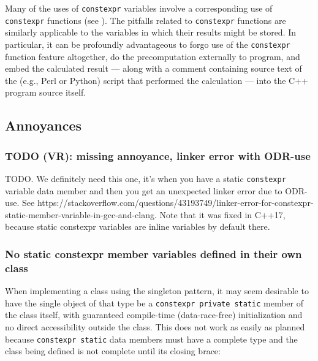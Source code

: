 Many of the uses of \lstinline!constexpr! variables involve a corresponding
use of \lstinline!constexpr! functions (see ). The pitfalls related to \lstinline!constexpr! functions are
similarly applicable to the variables in which their results might be
stored. In particular, it can be profoundly advantageous to forgo use of
the \lstinline!constexpr! function feature altogether, do the
precomputation externally to program, and embed the calculated result
--- along with a comment containing source text of the (e.g., Perl or
Python) script that performed the calculation --- into the C++ program
source itself.

\subsection[Annoyances]{Annoyances}\label{annoyances}

\subsubsection[TODO (VR): missing annoyance, linker error with ODR-use]{TODO (VR): missing annoyance, linker error with ODR-use}\label{todo-(vr):-missing-annoyance,-linker-error-with-odr-use}

TODO. We definitely need this one, it's when you have a static
\lstinline!constexpr! variable data member and then you get an unexpected
linker error due to ODR-use. See
https://\linebreak[4]
stackoverflow.com/questions/43193749/linker-error-for-constexpr-static-member-variable-in-gcc-and-clang.
Note that it was fixed in C++17, because static constexpr variables are
inline variables by default there.

\subsubsection[No static \lstinline!constexpr! member variables defined in their own class]{No static {\SubsubsecCode constexpr} member variables defined in their own class}\label{no-static-constexpr-member-variables-defined-in-their-own-class}

When implementing a class using the singleton pattern, it may seem
desirable to have the single object of that type be a
\lstinline!constexpr!~\lstinline!private!~\lstinline!static! member of the class
itself, with guaranteed compile-time (data-race-free) initialization and
no direct accessibility outside the class. This does not work as easily
as planned because \lstinline!constexpr!~\lstinline!static! data members must
have a complete type and the class being defined is not complete until
its closing brace:

